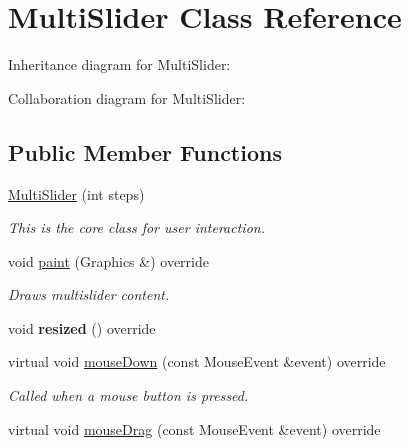 \hypertarget{class_multi_slider}{}\section{Multi\+Slider Class Reference}
\label{class_multi_slider}


Inheritance diagram for Multi\+Slider\+:


Collaboration diagram for Multi\+Slider\+:
\subsection*{Public Member Functions}
\begin{DoxyCompactItemize}
\item 
\hyperlink{class_multi_slider_a10a78d4cbf4d1f05871ebdb59668ae24}{Multi\+Slider} (int steps)
\begin{DoxyCompactList}\small\item\em This is the core class for user interaction. \end{DoxyCompactList}\item 
void \hyperlink{class_multi_slider_ab4b5d35d7d550d8066603dad674bafdf}{paint} (Graphics \&) override\hypertarget{class_multi_slider_ab4b5d35d7d550d8066603dad674bafdf}{}\label{class_multi_slider_ab4b5d35d7d550d8066603dad674bafdf}

\begin{DoxyCompactList}\small\item\em Draws multislider content. \end{DoxyCompactList}\item 
void {\bfseries resized} () override\hypertarget{class_multi_slider_a3b96a42d6d2772cb492d156ef8ec86b8}{}\label{class_multi_slider_a3b96a42d6d2772cb492d156ef8ec86b8}

\item 
virtual void \hyperlink{class_multi_slider_a2703ad25c777a65399038df01b518f2b}{mouse\+Down} (const Mouse\+Event \&event) override\hypertarget{class_multi_slider_a2703ad25c777a65399038df01b518f2b}{}\label{class_multi_slider_a2703ad25c777a65399038df01b518f2b}

\begin{DoxyCompactList}\small\item\em Called when a mouse button is pressed. \end{DoxyCompactList}\item 
virtual void \hyperlink{class_multi_slider_a487d28df1e4f7eb0282b65f4f7849776}{mouse\+Drag} (const Mouse\+Event \&event) override\hypertarget{class_multi_slider_a487d28df1e4f7eb0282b65f4f7849776}{}\label{class_multi_slider_a487d28df1e4f7eb0282b65f4f7849776}


\end{DoxyCompactItemize}
